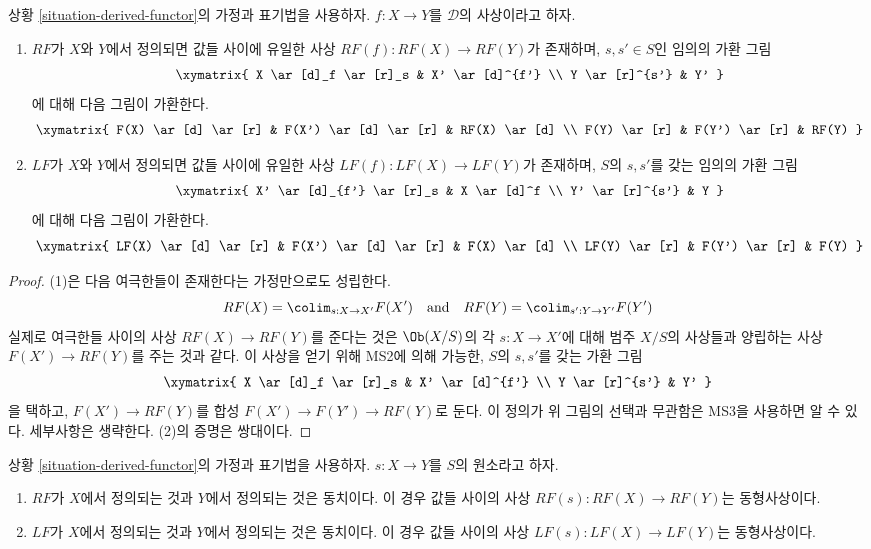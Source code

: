\begin{lemma}
\label{lemma-derived-functor}
상황 \ref{situation-derived-functor}의 가정과 표기법을 사용하자.
$f : X \to Y$를 $\mathcal{D}$의 사상이라고 하자.
\begin{enumerate}
\item $RF$가 $X$와 $Y$에서 정의되면 값들 사이에 유일한 사상
$RF(f) : RF(X) \to RF(Y)$가 존재하며, $s, s' \in S$인 임의의 가환 그림
$$
\xymatrix{
X \ar[d]_f \ar[r]_s & X' \ar[d]^{f'} \\
Y \ar[r]^{s'} & Y'
}
$$
에 대해 다음 그림이 가환한다.
$$
\xymatrix{
F(X) \ar[d] \ar[r] & F(X') \ar[d] \ar[r] & RF(X) \ar[d] \\
F(Y) \ar[r] & F(Y') \ar[r] & RF(Y)
}
$$
\item $LF$가 $X$와 $Y$에서 정의되면 값들 사이에 유일한 사상
$LF(f) : LF(X) \to LF(Y)$가 존재하며, $S$의 $s, s'$를 갖는 임의의
가환 그림
$$
\xymatrix{
X' \ar[d]_{f'} \ar[r]_s & X \ar[d]^f \\
Y' \ar[r]^{s'} & Y
}
$$
에 대해 다음 그림이 가환한다.
$$
\xymatrix{
LF(X) \ar[d] \ar[r] & F(X') \ar[d] \ar[r] & F(X) \ar[d] \\
LF(Y) \ar[r] & F(Y') \ar[r] & F(Y)
}
$$
\end{enumerate}
\end{lemma}

\begin{proof}
(1)은 다음 여극한들이 존재한다는 가정만으로도 성립한다.
$$
RF(X) = \colim_{s : X \to X'} F(X')
\quad\text{and}\quad
RF(Y) = \colim_{s' : Y \to Y'} F(Y')
$$
실제로 여극한들 사이의 사상 $RF(X) \to RF(Y)$를 준다는 것은
$\Ob(X/S)$의 각 $s : X \to X'$에 대해 범주 $X/S$의 사상들과 양립하는
사상 $F(X') \to RF(Y)$를 주는 것과 같다. 이 사상을 얻기 위해 MS2에 의해
가능한, $S$의 $s, s'$를 갖는 가환 그림
$$
\xymatrix{
X \ar[d]_f \ar[r]_s & X' \ar[d]^{f'} \\
Y \ar[r]^{s'} & Y'
}
$$
을 택하고, $F(X') \to RF(Y)$를 합성
$F(X') \to F(Y') \to RF(Y)$로 둔다. 이 정의가 위 그림의 선택과 무관함은
MS3을 사용하면 알 수 있다. 세부사항은 생략한다. (2)의 증명은 쌍대이다.
\end{proof}

\begin{lemma}
\label{lemma-derived-inverts}
상황 \ref{situation-derived-functor}의 가정과 표기법을 사용하자.
$s : X \to Y$를 $S$의 원소라고 하자.
\begin{enumerate}
\item $RF$가 $X$에서 정의되는 것과 $Y$에서 정의되는 것은 동치이다.
이 경우 값들 사이의 사상 $RF(s) : RF(X) \to RF(Y)$는 동형사상이다.
\item $LF$가 $X$에서 정의되는 것과 $Y$에서 정의되는 것은 동치이다.
이 경우 값들 사이의 사상 $LF(s) : LF(X) \to LF(Y)$는 동형사상이다.
\end{enumerate}
\end{lemma}

